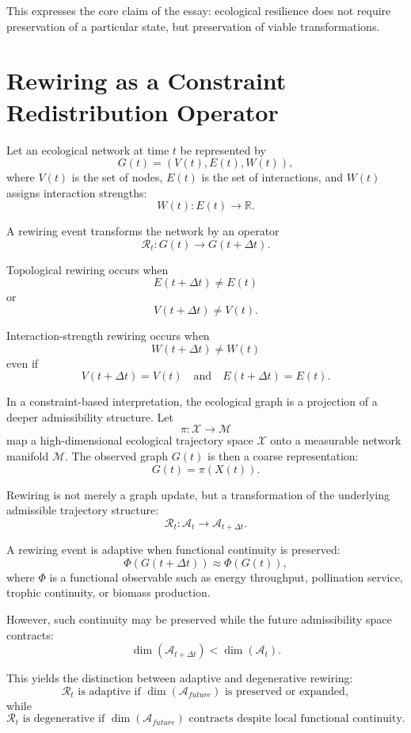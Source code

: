 \documentclass[11pt,a4paper]{article}
\newcommand{\Aspace}{\mathcal{A}}
\newcommand{\Mspace}{\mathcal{M}}
\newcommand{\Xspace}{\mathcal{X}}
\begin{document}
This expresses the core claim of the essay: ecological resilience does not require preservation of a particular state, but preservation of viable transformations.

\section{Rewiring as a Constraint Redistribution Operator}

Let an ecological network at time $t$ be represented by
\[
G(t)=(V(t),E(t),W(t)),
\]
where $V(t)$ is the set of nodes, $E(t)$ is the set of interactions, and $W(t)$ assigns interaction strengths:
\[
W(t):E(t)\rightarrow \mathbb{R}.
\]

A rewiring event transforms the network by an operator
\[
\mathcal{R}_t:G(t)\rightarrow G(t+\Delta t).
\]

Topological rewiring occurs when
\[
E(t+\Delta t)\neq E(t)
\]
or
\[
V(t+\Delta t)\neq V(t).
\]

Interaction-strength rewiring occurs when
\[
W(t+\Delta t)\neq W(t)
\]
even if
\[
V(t+\Delta t)=V(t)
\quad \text{and} \quad
E(t+\Delta t)=E(t).
\]

In a constraint-based interpretation, the ecological graph is a projection of a deeper admissibility structure. Let
\[
\pi:\Xspace\rightarrow \Mspace
\]
map a high-dimensional ecological trajectory space $\Xspace$ onto a measurable network manifold $\Mspace$. The observed graph $G(t)$ is then a coarse representation:
\[
G(t)=\pi(X(t)).
\]

Rewiring is not merely a graph update, but a transformation of the underlying admissible trajectory structure:
\[
\mathcal{R}_t:\Aspace_t\rightarrow \Aspace_{t+\Delta t}.
\]

A rewiring event is adaptive when functional continuity is preserved:
\[
\Phi(G(t+\Delta t))\approx \Phi(G(t)),
\]
where $\Phi$ is a functional observable such as energy throughput, pollination service, trophic continuity, or biomass production.

However, such continuity may be preserved while the future admissibility space contracts:
\[
\dim(\Aspace_{t+\Delta t}) < \dim(\Aspace_t).
\]

This yields the distinction between adaptive and degenerative rewiring:
\[
\mathcal{R}_t \text{ is adaptive if }
\dim(\Aspace_{future}) \text{ is preserved or expanded},
\]
while
\[
\mathcal{R}_t \text{ is degenerative if }
\dim(\Aspace_{future}) \text{ contracts despite local functional continuity}.
\]
\end{document}
